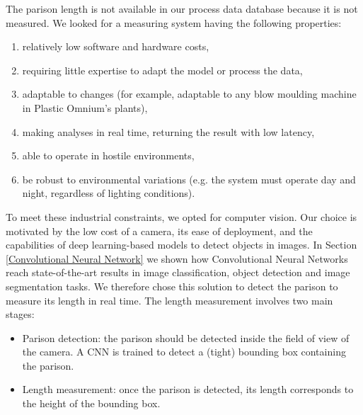 The parison length is not available in our process data database because it is not measured. We looked for a measuring system having the following properties:
%
\begin{enumerate}
    \item relatively low software and hardware costs,
    \item requiring little expertise to adapt the model or process the data,
    \item adaptable to changes (for example, adaptable to any blow moulding machine in Plastic Omnium's plants),
    \item making analyses in real time, returning the result with low latency,
    \item able to operate in hostile environments,
    \item be robust to environmental variations (e.g. the system must operate day and night, regardless of lighting conditions).
\end{enumerate}
%
To meet these industrial constraints, we opted for computer vision. Our choice is motivated by the low cost of a camera, its ease of deployment, and the capabilities of deep learning-based models to detect objects in images. In Section \ref{Convolutional Neural Network} we shown how Convolutional Neural Networks reach state-of-the-art results in image classification, object detection and image segmentation tasks. We therefore chose this solution  to detect the parison to measure its length in real time.
The length measurement involves two main stages:
\begin{itemize}
    \item Parison detection: the parison should be detected inside the field of view of the camera. A CNN is trained to detect a (tight) bounding box containing the parison. 
    \item Length measurement: once the parison is detected, its length corresponds to the height of the bounding box.
\end{itemize}

